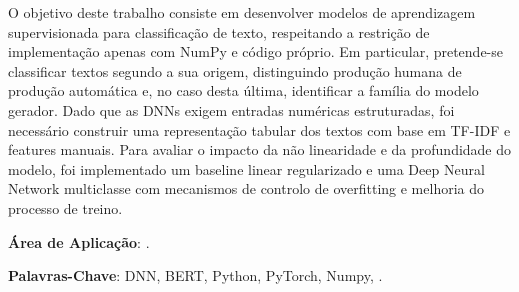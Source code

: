 \documentclass[a4paper,12pt]{scrreprt}
\begin{document}

\makecover



\renewenvironment{abstract}
 {\par\noindent\textbf{\Large\abstractname}\par\bigskip}
 {}

\begin{flushleft}
\begin{abstract}
    O objetivo deste trabalho consiste em desenvolver modelos de aprendizagem supervisionada para classificação de texto, respeitando a restrição de implementação apenas com NumPy e código próprio. Em particular, pretende-se classificar textos segundo a sua origem, distinguindo produção humana de produção automática e, no caso desta última, identificar a família do modelo gerador. Dado que as DNNs exigem entradas numéricas estruturadas, foi necessário construir uma representação tabular dos textos com base em TF-IDF e features manuais. Para avaliar o impacto da não linearidade e da profundidade do modelo, foi implementado um baseline linear regularizado e uma Deep Neural Network multiclasse com mecanismos de controlo de overfitting e melhoria do processo de treino.

    \par \textbf{Área de Aplicação}: .
    \par \textbf{Palavras-Chave}: DNN, BERT, Python, PyTorch, Numpy, .
\end{abstract}
\end{flushleft}

\pagebreak



\renewcommand{\contentsname}{Índice}
\end{document}
